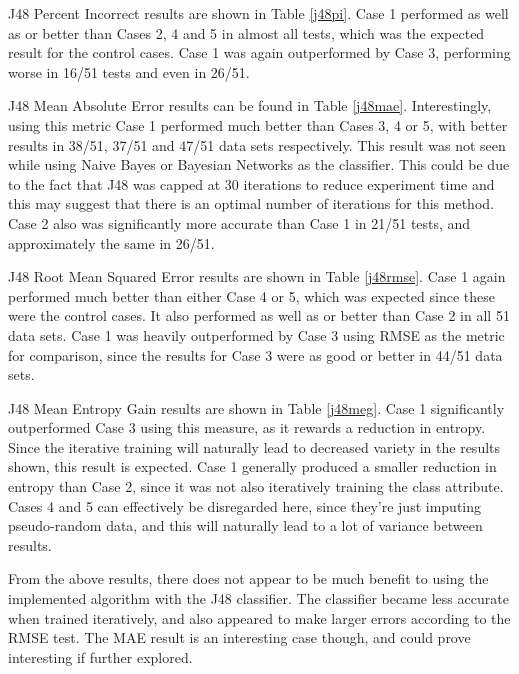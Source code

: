 J48 Percent Incorrect results are shown in Table \ref{j48pi}. Case 1 performed as well as or better than Cases 2, 4 and 5 in almost all tests, which was the expected result for the control cases. Case 1 was again outperformed by Case 3, performing worse in 16/51 tests and even in 26/51. 

J48 Mean Absolute Error results can be found in Table \ref{j48mae}. Interestingly, using this metric Case 1 performed much better than Cases 3, 4 or 5, with better results in 38/51, 37/51 and 47/51 data sets respectively. This result was not seen while using Naive Bayes or Bayesian Networks as the classifier. This could be due to the fact that J48 was capped at 30 iterations to reduce experiment time and this may suggest that there is an optimal number of iterations for this method. Case 2 also was significantly more accurate than Case 1 in 21/51 tests, and approximately the same in 26/51.  

J48 Root Mean Squared Error results are shown in Table \ref{j48rmse}. Case 1 again performed much better than either Case 4 or 5, which was expected since these were the control cases. It also performed as well as or better than Case 2 in all 51 data sets. Case 1 was heavily outperformed by Case 3 using RMSE as the metric for comparison, since the results for Case 3 were as good or better in 44/51 data sets.

J48 Mean Entropy Gain results are shown in Table \ref{j48meg}. Case 1 significantly outperformed Case 3 using this measure, as it rewards a reduction in entropy. Since the iterative training will naturally lead to decreased variety in the results shown, this result is expected. Case 1 generally produced a smaller reduction in entropy than Case 2, since it was not also iteratively training the class attribute. Cases 4 and 5 can effectively be disregarded here, since they're just imputing pseudo-random data, and this will naturally lead to a lot of variance between results.

From the above results, there does not appear to be much benefit to using the implemented algorithm with the J48 classifier. The classifier became less accurate when trained iteratively, and also appeared to make larger errors according to the RMSE test. The MAE result is an interesting case though, and could prove interesting if further explored.





\FloatBarrier

